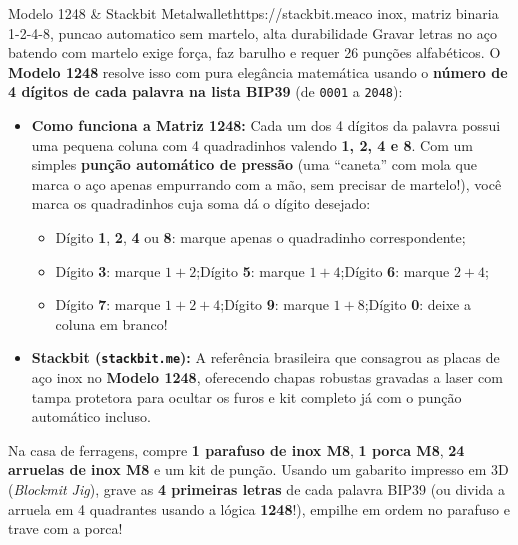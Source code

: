 \documentclass{pousadaguide}
\begin{document}
\begin{ferramenta}[goat,logo=stackbit]{Modelo 1248 \& Stackbit Metalwallet}{https://stackbit.me}{aco inox, matriz binaria 1-2-4-8, puncao automatico sem martelo, alta durabilidade}
Gravar letras no aço batendo com martelo exige força, faz barulho e requer 26 punções alfabéticos. O \textbf{Modelo 1248} resolve isso com pura elegância matemática usando o \textbf{número de 4 dígitos de cada palavra na lista BIP39} (de \texttt{0001} a \texttt{2048}):
\begin{itemize}
  \item \textbf{Como funciona a Matriz 1248:} Cada um dos 4 dígitos da palavra possui uma pequena coluna com 4 quadradinhos valendo \textbf{1, 2, 4 e 8}. Com um simples \textbf{punção automático de pressão} (uma ``caneta'' com mola que marca o aço apenas empurrando com a mão, sem precisar de martelo!), você marca os quadradinhos cuja soma dá o dígito desejado:
  \begin{itemize}
    \item Dígito \textbf{1}, \textbf{2}, \textbf{4} ou \textbf{8}: marque apenas o quadradinho correspondente;
    \item Dígito \textbf{3}: marque $1+2$;\quad Dígito \textbf{5}: marque $1+4$;\quad Dígito \textbf{6}: marque $2+4$;
    \item Dígito \textbf{7}: marque $1+2+4$;\quad Dígito \textbf{9}: marque $1+8$;\quad Dígito \textbf{0}: deixe a coluna em branco!
  \end{itemize}
  \item \textbf{Stackbit (\texttt{stackbit.me}):} A referência brasileira que consagrou as placas de aço inox no \textbf{Modelo 1248}, oferecendo chapas robustas gravadas a laser com tampa protetora para ocultar os furos e kit completo já com o punção automático incluso.
\end{itemize}
\end{ferramenta}

\begin{dica}
Na casa de ferragens, compre \textbf{1 parafuso de inox M8}, \textbf{1 porca M8}, \textbf{24 arruelas de inox M8} e um kit de punção. Usando um gabarito impresso em 3D (\emph{Blockmit Jig}), grave as \textbf{4 primeiras letras} de cada palavra BIP39 (ou divida a arruela em 4 quadrantes usando a lógica \textbf{1248}!), empilhe em ordem no parafuso e trave com a porca!
\end{dica}
\end{document}
